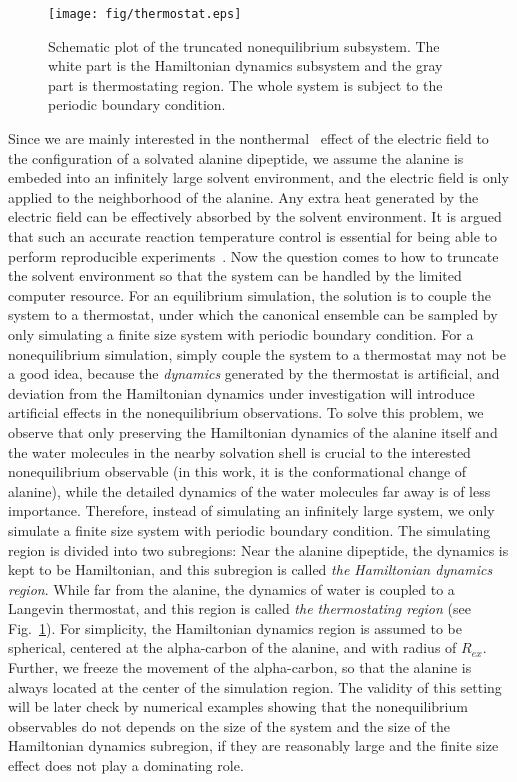 \documentclass[a4paper,preprint,unsortedaddress,onecolumn]{revtex4-1}
\begin{document}
\begin{figure}
  \centering
  \texttt{[image: fig/thermostat.eps]}
  \caption{Schematic plot of the truncated nonequilibrium subsystem.
    The white part is the Hamiltonian dynamics subsystem
    and the gray part is thermostating region. The whole system
    is subject to the periodic boundary condition.}
  \label{fig:tmp2}
\end{figure}

Since we are mainly interested in the
nonthermal~\cite{delaHoz2005microwaves} effect of the electric field
to the configuration of a solvated alanine dipeptide, we assume the
alanine is embeded into an infinitely large solvent environment, and
the electric field is only applied to the neighborhood of the alanine.
Any extra heat generated by the electric field can be effectively
absorbed by the solvent environment.  It is argued that such an
accurate reaction temperature control is essential for being able to
perform reproducible experiments~\cite{damm2012can}.
Now the question comes to how to truncate the solvent environment
so that the system can be handled by the limited computer resource.
For an equilibrium simulation, the solution is to couple
the system to a thermostat, under which the canonical ensemble can be
sampled by only simulating a finite size system with periodic boundary
condition. For a nonequilibrium simulation, simply couple the system
to a thermostat may not be a good idea, because the \emph{dynamics}
generated by the thermostat is artificial, and deviation from the
Hamiltonian dynamics under investigation will introduce artificial
effects in the nonequilibrium observations. To solve this problem, we
observe that only preserving the Hamiltonian dynamics of the alanine 
itself and the water molecules in the nearby solvation shell is
crucial to the interested nonequilibrium observable
(in this work, it is the conformational change of alanine),
while the detailed dynamics of
the water molecules far away is of less importance. 
Therefore, instead of simulating an infinitely
large system, we only simulate a finite size system with periodic
boundary condition. The simulating region is divided into two
subregions: Near the alanine dipeptide, the dynamics is kept to be
Hamiltonian, and this subregion is called \emph{the Hamiltonian dynamics
region}. While far from the alanine, the dynamics of water is coupled
to a Langevin thermostat, and this region is called \emph{the thermostating
region} (see Fig.~\ref{fig:tmp2}).  For simplicity, the Hamiltonian
dynamics region is assumed to be spherical, centered at the
alpha-carbon of the alanine, and with radius of $R_{ex}$.  Further, we
freeze the movement of the alpha-carbon, so that the alanine is always
located at the center of the simulation region.  The validity of this
setting will be later check by numerical examples showing that the
nonequilibrium observables do not depends on the size of the system
and the size of the Hamiltonian dynamics subregion, if they are
reasonably large and the finite size effect does not play a dominating role.
\end{document}
